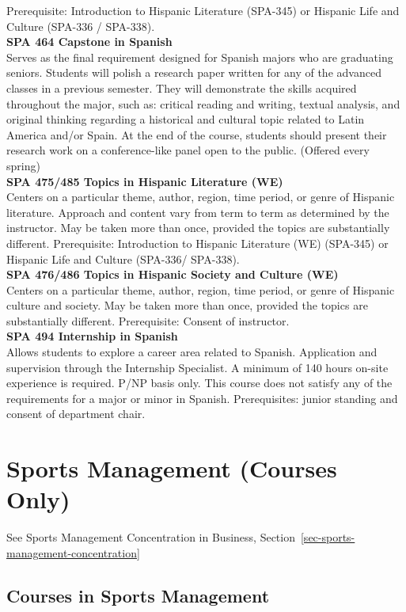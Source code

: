 \documentclass[
  letterpaper,
]{scrbook}
\begin{document}
Prerequisite: Introduction to Hispanic Literature (SPA-345) or Hispanic
Life and Culture (SPA-336 / SPA-338).\\
\textbf{SPA 464 Capstone in Spanish}\\
Serves as the final requirement designed for Spanish majors who are
graduating seniors. Students will polish a research paper written for
any of the advanced classes in a previous semester. They will
demonstrate the skills acquired throughout the major, such as: critical
reading and writing, textual analysis, and original thinking regarding a
historical and cultural topic related to Latin America and/or Spain. At
the end of the course, students should present their research work on a
conference-like panel open to the public. (Offered every spring)\\
\textbf{SPA 475/485 Topics in Hispanic Literature (WE)}\\
Centers on a particular theme, author, region, time period, or genre of
Hispanic literature. Approach and content vary from term to term as
determined by the instructor. May be taken more than once, provided the
topics are substantially different. Prerequisite: Introduction to
Hispanic Literature (WE) (SPA-345) or Hispanic Life and Culture
(SPA-336/ SPA-338).\\
\textbf{SPA 476/486 Topics in Hispanic Society and Culture (WE)}\\
Centers on a particular theme, author, region, time period, or genre of
Hispanic culture and society. May be taken more than once, provided the
topics are substantially different. Prerequisite: Consent of
instructor.\\
\textbf{SPA 494 Internship in Spanish}\\
Allows students to explore a career area related to Spanish. Application
and supervision through the Internship Specialist. A minimum of 140
hours on-site experience is required. P/NP basis only. This course does
not satisfy any of the requirements for a major or minor in Spanish.
Prerequisites: junior standing and consent of department chair.

\section{Sports Management (Courses
Only)}\label{sports-management-courses-only}

See Sports Management Concentration in Business,
Section~\ref{sec-sports-management-concentration}

\subsection{Courses in Sports
Management}\label{courses-in-sports-management}
\end{document}
